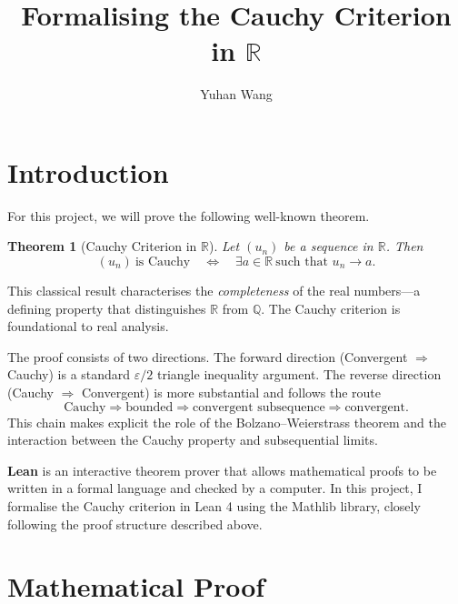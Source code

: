 \documentclass[11pt]{article}
\title{Formalising the Cauchy Criterion in \(\mathbb{R}\)}
\author{Yuhan Wang}
\date{}
\newtheorem{theorem}{Theorem}
\begin{document}
\maketitle

\section{Introduction}

For this project, we will prove the following well-known theorem. 

\begin{theorem}[Cauchy Criterion in \(\mathbb{R}\)]
Let \((u_n)\) be a sequence in \(\mathbb{R}\). Then
\[
(u_n)\ \text{is Cauchy} \quad\Longleftrightarrow\quad \exists a\in\mathbb{R}\ \text{such that } u_n \to a.
\]
\end{theorem}

This classical result characterises the \emph{completeness} of the real numbers---a defining property that distinguishes \(\mathbb{R}\) from \(\mathbb{Q}\). The Cauchy criterion is foundational to real analysis.


The proof consists of two directions. The forward direction (Convergent \(\Rightarrow\) Cauchy) is a standard \(\varepsilon/2\) triangle inequality argument. The reverse direction (Cauchy \(\Rightarrow\) Convergent) is more substantial and follows the route
\[
\text{Cauchy} \Rightarrow \text{bounded} \Rightarrow \text{convergent subsequence} \Rightarrow \text{convergent}.
\]
This chain makes explicit the role of the Bolzano--Weierstrass theorem and the interaction between the Cauchy property and subsequential limits.

\textbf{Lean} is an interactive theorem prover that allows mathematical proofs to be written in a formal language and checked by a computer. In this project, I formalise the Cauchy criterion in Lean 4 using the Mathlib library, closely following the proof structure described above.

\section{Mathematical Proof}
\end{document}
